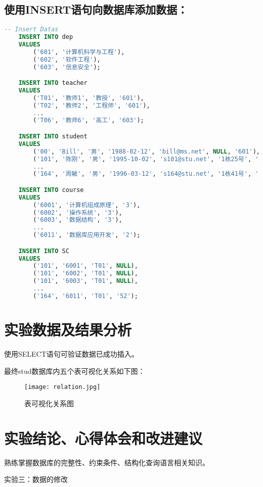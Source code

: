 \documentclass[a4paper]{uestcreport}
\begin{document}
\subsection{使用INSERT语句向数据库添加数据：}
\begin{lstlisting}[language=SQL]
    -- Insert Datas
    INSERT INTO dep
    VALUES
        ('601', '计算机科学与工程'),
        ('602', '软件工程'),
        ('603', '信息安全');

    INSERT INTO teacher
    VALUES
        ('T01', '教师1', '教授', '601'),
        ('T02', '教师2', '工程师', '601'),
        ...
        ('T06', '教师6', '高工', '603');

    INSERT INTO student
    VALUES
        ('00', 'Bill', '男', '1988-02-12', 'bill@ms.net', NULL, '601'),
        ('101', '陈刚', '男', '1995-10-02', 's101@stu.net', '1栋25号', '601'),
        ...
        ('164', '周敏', '男', '1996-03-12', 's164@stu.net', '1栋41号', '602');

    INSERT INTO course
    VALUES
        ('6001', '计算机组成原理', '3'),
        ('6002', '操作系统', '3'),
        ('6003', '数据结构', '3'),
        ...
        ('6011', '数据库应用开发', '2');

    INSERT INTO SC
    VALUES
        ('101', '6001', 'T01', NULL),
        ('101', '6002', 'T01', NULL),
        ('101', '6003', 'T01', NULL),
        ...
        ('164', '6011', 'T01', '52');
\end{lstlisting}

\section{实验数据及结果分析}
使用SELECT语句可验证数据已成功插入。

最终stud数据库内五个表可视化关系如下图：
\begin{figure}[!htbp]
    \centering
    \texttt{[image: relation.jpg]}
    \caption{表可视化关系图}
\end{figure}

\section{实验结论、心得体会和改进建议}
熟练掌握数据库的完整性、约束条件、结构化查询语言相关知识。

\newpage
\begin{center}
    \Large
    实验三：数据的修改
\end{center}

\setcounter{section}{0}
\end{document}
